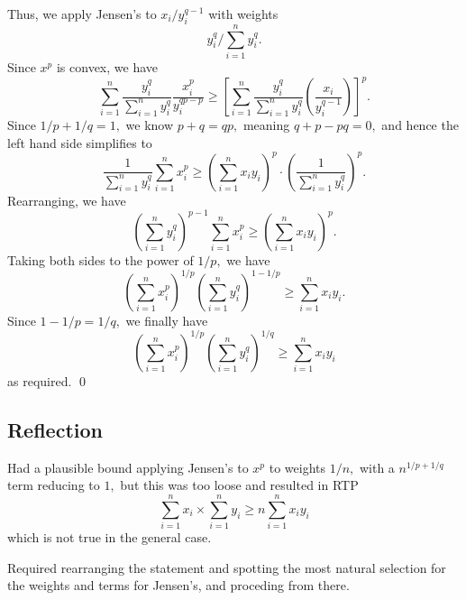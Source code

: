 \documentclass[12pt]{article}
\begin{document}
\begin{enumerate}
    Thus, we apply Jensen's to $x_i/y_i^{q-1}$ with weights
    $$y_i^{q}/\sum_{i = 1}^{n}y_i^q.$$ Since $x^p$ is convex, we have
    $$
    \sum_{i = 1}^{n} \dfrac{y_i^q}{\sum_{i = 1}^{n}y_i^q}
    \dfrac{x_i^p}{y_i^{qp - p}} \geq \left[\sum_{i = 1}^{n}
      \dfrac{y_i^q}{\sum_{i = 1}^{n}y_i^q} \left(
        \dfrac{x_i}{y_i^{q-1}}
    \right)\right]^{p}.
    $$
    Since $1/p + 1/q = 1, $ we know $p + q = qp,$ meaning $q + p - pq
    = 0,$ and hence the left hand side simplifies to
    $$
    \dfrac{1}{\sum_{i = 1}^{n}y_i^q}\sum_{i = 1}^{n} x_i^p \geq
    \left(\sum_{i = 1}^{n} x_i y_i\right)^p \cdot
    \left(\dfrac{1}{\sum_{i = 1}^{n} y_i^q}\right)^{p}.
    $$
    Rearranging, we have
    $$
    \left(\sum_{i = 1}^{n}y_i^q \right)^{p-1}  \sum_{i = 1}^{n} x_i^p
    \geq \left(\sum_{i = 1}^{n} x_i y_i\right)^p.
    $$
    Taking both sides to the power of $1/p,$ we have
    $$
    \left(
      \sum_{i = 1}^{n} x_i^p
    \right)^{1/p} \left(\sum_{i = 1}^{n}y_i^q\right)^{1-1/p} \geq
    \sum_{i = 1}^{n} x_i y_i.
    $$
    Since $1 - 1/p = 1/q,$ we finally have
    $$
    \left(
      \sum_{i = 1}^{n} x_i^p
    \right)^{1/p} \left(\sum_{i = 1}^{n}y_i^q\right)^{1/q} \geq
    \sum_{i = 1}^{n} x_i y_i
    $$
    as required. \qed
\end{enumerate}

\subsection{Reflection}
Had a plausible bound applying Jensen's to $x^p$ to weights $1/n,$
with a $n^{1/p + 1/q}$ term reducing to $1,$ but this was too loose
and resulted in RTP
$$
\sum_{i = 1}^{n} x_i \times \sum_{i = 1}^{n} y_i \geq n\sum_{i = 1}^{n} x_iy _i
$$
which is not true in the general case.

Required rearranging the statement and spotting the most natural
selection for the weights and terms for Jensen's, and proceding from there.
\end{document}
